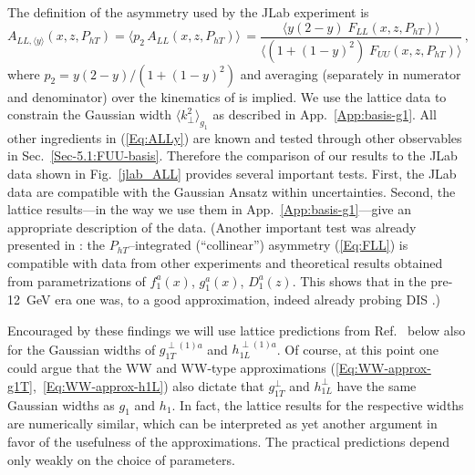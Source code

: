 \documentclass[a4paper,11pt]{article}
\newcommand{\be}{\begin{equation}}
\newcommand{\ee}{\end{equation}}
\newcommand{\la}{\langle}
\newcommand{\ra}{\rangle}
\def\Phperp{P_{hT}}
\def\kperp{k_\perp}
\begin{document}
The definition of the asymmetry used by the JLab experiment \cite{Avakian:2010ae} is
\be\label{Eq:ALLy}
	A_{LL,\la y\ra}(x,z,\Phperp)
	= \la p_2 \,A_{LL}(x,z,\Phperp) \ra \,
	= \frac{\la y (2-y) \; F_{LL}(x,z,\Phperp)\ra}
	{\la(1+(1-y)^2) \; F_{UU}(x,z,\Phperp)\ra} \, ,
\ee
where $p_2 = y (2-y)/(1+(1-y)^2)$ and averaging (separately in numerator
and denominator) over the kinematics of \cite{Avakian:2010ae} is implied.
We use the lattice data \cite{Hagler:2009mb} to
constrain the Gaussian width $\la\kperp^2\ra_{g_1}$ as described in
App.~\ref{App:basis-g1}. All other ingredients in (\ref{Eq:ALLy}) are known
and tested through other observables in Sec.~\ref{Sec-5.1:FUU-basis}.
Therefore the comparison of our results to the JLab data \cite{Avakian:2010ae}
shown in Fig.~\ref{jlab_ALL} provides several important tests.
First, the JLab data \cite{Avakian:2010ae} are compatible
with the Gaussian Ansatz within uncertainties. Second, the lattice
results---in the way we use them in App.~\ref{App:basis-g1}---give an appropriate
description of the data.
	(Another important test was already presented in
	\cite{Avakian:2010ae}: the $\Phperp$--integrated (``collinear'')
	asymmetry (\ref{Eq:FLL}) is compatible with data
	from other experiments and theoretical results obtained from
	parametrizations of $f_1^a(x)$, $g_1^a(x)$, $D_1^a(z)$. This
	shows that in the pre-12~GeV era one was, to a good
	approximation, indeed already probing DIS \cite{Avakian:2010ae}.)

Encouraged by these findings we will use lattice predictions from
Ref.~\cite{Hagler:2009mb} below also for the Gaussian widths of
$g_{1T}^{\perp(1)a}$ and $h_{1L}^{\perp(1)a}$.
Of course, at this point one could argue that the WW and WW-type
approximations (\ref{Eq:WW-approx-g1T},~\ref{Eq:WW-approx-h1L}) also
dictate that $g_{1T}^\perp$ and $h_{1L}^\perp$ have the same Gaussian
widths as $g_1$ and $h_1$. In fact, the lattice results for the
respective widths are numerically similar, which can be interpreted as
yet another argument in favor of the usefulness of the approximations.
The practical predictions depend only weakly on the choice of parameters.
\end{document}
